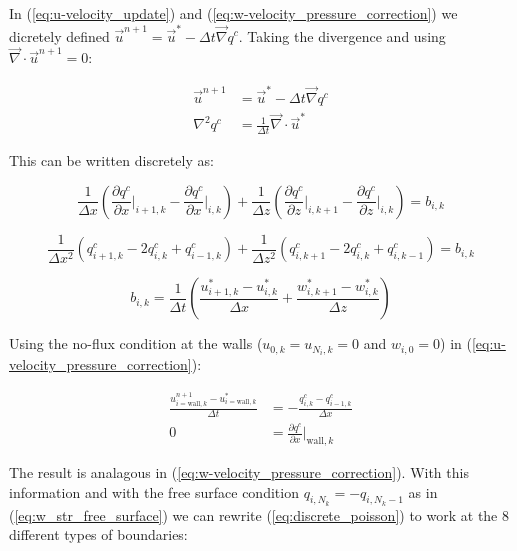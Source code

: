\documentclass[12pt]{article}
\begin{document}
\section{}

In (\ref{eq:u-velocity_update}) and (\ref{eq:w-velocity_pressure_correction}) we dicretely defined $\vec{u}^{n+1} = \vec{u}^* - \Delta t \vec{\nabla} q^c$. Taking the divergence and using $\vec{\nabla} \cdot \vec{u}^{n+1} = 0$:

\begin{align*}
\vec{u}^{n+1} &= \vec{u}^* - \Delta t \vec{\nabla} q^c
\\
\nabla^2 q^c &= \frac{1}{\Delta t} \vec{\nabla} \cdot \vec{u}^*
\end{align*}

This can be written discretely as:

\begin{equation} \label{eq:poisson_with_derivatives}
\frac{1}{\Delta x} \left( \frac{\partial q^c}{\partial x} \bigg|_{i+1,k} - \frac{\partial q^c}{\partial x} \bigg|_{i,k} \right) 
+ \frac{1}{\Delta z} \left( \frac{\partial q^c}{\partial z} \bigg|_{i,k+1} - \frac{\partial q^c}{\partial z} \bigg|_{i,k} \right) = b_{i,k}
\end{equation}

\begin{equation} \label{eq:discrete_poisson}
\frac{1}{\Delta x^2} (q_{i+1,k}^c - 2 q_{i,k}^c + q_{i-1,k}^c) 
+ \frac{1}{\Delta z^2} (q_{i,k+1}^c- 2 q_{i,k}^c + q_{i,k-1}^c) = b_{i,k}
\end{equation}

\begin{equation*}
b_{i,k} = \frac{1}{\Delta t} \left( \frac{u_{i+1,k}^* - u_{i,k}^*}{\Delta x}  + \frac{w_{i,k+1}^* - w_{i,k}^*}{\Delta z}\right)
\end{equation*}

Using the no-flux condition at the walls ($u_{0,k}=u_{N_i,k}=0$ and $w_{i,0} = 0$) in (\ref{eq:u-velocity_pressure_correction}):

\begin{align*}
\frac{u_{i=\text{wall},k}^{n+1} - u_{i=\text{wall},k}^*}{\Delta t} &= -\frac{q_{i,k}^c - q_{i-1,k}^c}{\Delta x}
\\
0 &= \frac{\partial q^c}{\partial x} \bigg|_{\text{wall},k}
\end{align*}

The result is analagous in (\ref{eq:w-velocity_pressure_correction}). With this information and with the free surface condition $q_{i,N_k}=-q_{i,N_k-1}$ as in (\ref{eq:w_str_free_surface}) we can rewrite (\ref{eq:discrete_poisson}) to work at the 8 different types of boundaries:
\end{document}
